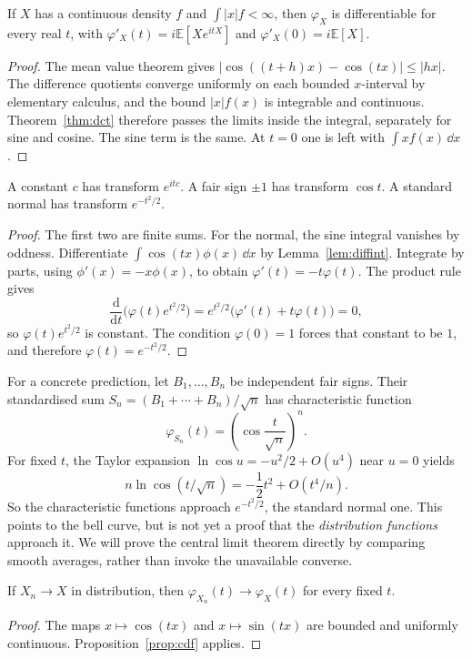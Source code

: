 \begin{lemma}\label{lem:diffint}
If $X$ has a continuous density $f$ and $\int|x|f<\infty$, then $\varphi_X$ is differentiable for every real $t$, with $\varphi'_X(t)=i\mathbb E[Xe^{itX}]$ and $\varphi'_X(0)=i\mathbb E[X]$.
\end{lemma}
\begin{proof}
The mean value theorem gives $|\cos((t+h)x)-\cos(tx)|\le|hx|$. The difference quotients converge uniformly on each bounded $x$-interval by elementary calculus, and the bound $|x|f(x)$ is integrable and continuous. Theorem~\ref{thm:dct} therefore passes the limits inside the integral, separately for sine and cosine. The sine term is the same. At $t=0$ one is left with $\int x f(x)\,\dd x$.
\end{proof}

\begin{proposition}\label{prop:cfexamples}
A constant $c$ has transform $e^{itc}$. A fair sign $\pm1$ has transform $\cos t$. A standard normal has transform $e^{-t^2/2}$.
\end{proposition}
\begin{proof}
The first two are finite sums. For the normal, the sine integral vanishes by oddness. Differentiate $\int\cos(tx)\phi(x)\,\dd x$ by Lemma~\ref{lem:diffint}. Integrate by parts, using $\phi'(x)=-x\phi(x)$, to obtain $\varphi'(t)=-t\varphi(t)$. The product rule gives
\[
 \frac{\mathrm d}{\mathrm dt}\bigl(\varphi(t)e^{t^2/2}\bigr)=e^{t^2/2}\bigl(\varphi'(t)+t\varphi(t)\bigr)=0,
\]
so $\varphi(t)e^{t^2/2}$ is constant. The condition $\varphi(0)=1$ forces that constant to be $1$, and therefore $\varphi(t)=e^{-t^2/2}$.
\end{proof}

For a concrete prediction, let $B_1,\ldots,B_n$ be independent fair signs. Their standardised sum $S_n=(B_1+\cdots+B_n)/\sqrt n$ has characteristic function
\[
 \varphi_{S_n}(t)=\left(\cos\frac{t}{\sqrt n}\right)^n.
\]
For fixed $t$, the Taylor expansion $\ln\cos u=-u^2/2+O(u^4)$ near $u=0$ yields
\[
 n\ln\cos(t/\sqrt n)=-\frac12t^2+O(t^4/n).
\]
So the characteristic functions approach $e^{-t^2/2}$, the standard normal one. This points to the bell curve, but is not yet a proof that the \emph{distribution functions} approach it. We will prove the central limit theorem directly by comparing smooth averages, rather than invoke the unavailable converse.

\begin{theoremx}\label{thm:cfconv}
If $X_n\to X$ in distribution, then $\varphi_{X_n}(t)\to\varphi_X(t)$ for every fixed $t$.
\end{theoremx}
\begin{proof}
The maps $x\mapsto\cos(tx)$ and $x\mapsto\sin(tx)$ are bounded and uniformly continuous. Proposition~\ref{prop:cdf} applies.
\end{proof}

